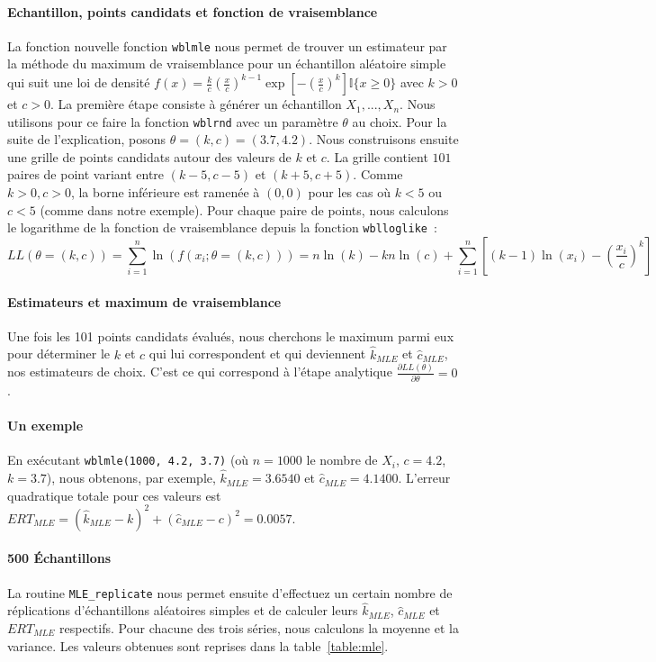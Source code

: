 \paragraph{Echantillon, points candidats et fonction de vraisemblance}
La fonction nouvelle fonction \texttt{wblmle} nous permet de trouver un estimateur par la méthode du maximum de vraisemblance pour un échantillon aléatoire simple qui suit une loi de densité
$ f(x)= \frac{k}{c} \left(\frac{x}{c}\right)^{k-1} \exp \left[ -\left(\frac{x}{c}\right)^{k}\right] \mathbb{I}\{x \geq 0\}$ avec $k>0$ et $c>0$.
La première étape consiste à générer un échantillon $X_1,...,X_n$. Nous utilisons pour ce faire la fonction \texttt{wblrnd} avec un paramètre  $\theta$ au choix. Pour la suite de l'explication, posons $\theta = (k,c) = (3.7, 4.2)$. Nous construisons ensuite une grille de points candidats autour des valeurs de $k$ et $c$. La grille contient $101$ paires de point variant entre $(k-5, c-5)$ et $(k+5, c+5)$. Comme $k>0, c>0$, la borne inférieure est ramenée à $(0,0)$ pour les cas où $k<5$ ou $c<5$ (comme dans notre exemple). Pour chaque paire de points, nous calculons le logarithme de la fonction de vraisemblance depuis la fonction \texttt{wblloglike}~:
$$LL(\theta=(k,c)) = \sum_{i=1}^{n}{\ln(f(x_i;\theta=(k,c)))} = n\ln(k) - kn\ln(c) + \sum_{i=1}^{n}{\left[(k-1)\ln(x_i) - \left(\frac{x_i}{c}\right)^{k}\right]}$$

\paragraph{Estimateurs et maximum de vraisemblance} Une fois les 101 points candidats évalués, nous cherchons le maximum parmi eux pour déterminer le $k$ et $c$ qui lui correspondent et qui deviennent $\hat{k}_{MLE}$ et $\hat{c}_{MLE}$, nos estimateurs de choix. C'est ce qui correspond à l'étape analytique $\frac{\partial LL(\theta)}{\partial \theta} = 0$.

\paragraph{Un exemple} En exécutant \texttt{wblmle(1000, 4.2, 3.7)} (où $n = 1000$ le nombre de $X_i$, $c = 4.2$, $k = 3.7$), nous obtenons, par exemple, $\hat{k}_{MLE} = 3.6540$ et $\hat{c}_{MLE} = 4.1400$.
L'erreur quadratique totale pour ces valeurs est $ERT_{MLE} = (\hat{k}_{MLE} - k)^2 + (\hat{c}_{MLE} - c)^2 = 0.0057$.

\paragraph{500 \'Echantillons} La routine \texttt{MLE\_replicate} nous permet ensuite d'effectuez un certain nombre de réplications d'échantillons aléatoires simples et de calculer leurs $\hat{k}_{MLE}$, $\hat{c}_{MLE}$ et $ERT_{MLE}$ respectifs. Pour chacune des trois séries, nous calculons la moyenne et la variance. Les valeurs obtenues sont reprises dans la table~\ref{table:mle}.

